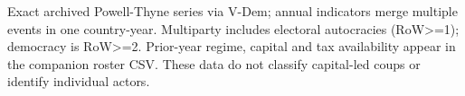 \begin{table}[htbp]\centering
\caption{Coup-event coverage and complete-case selection}
\label{tab:identification_coups}
\small
{}
\begin{tablenotes}\footnotesize Exact archived Powell-Thyne series via V-Dem; annual indicators merge multiple events in one country-year. Multiparty includes electoral autocracies (RoW>=1); democracy is RoW>=2. Prior-year regime, capital and tax availability appear in the companion roster CSV. These data do not classify capital-led coups or identify individual actors.\end{tablenotes}
\end{table}